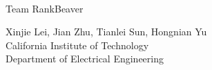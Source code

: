 \newif\ifshowsolutions
\showsolutionstrue

\newcommand{\boldline}[1]{\underline{\textbf{#1}}}



\pagestyle{fancy}
\begin{titlepage}
\parbox[t]{1.0\linewidth}{
	\centering \fontsize{50pt}{80pt}\selectfont %
	\vspace*{0.7cm} %
		
	\hfill {}\\
	\vspace*{0.7cm} %
}

{\centering \large 
\hfill Team RankBeaver
} \\

\vfill %


{\centering \large 
\hfill Xinjie Lei, Jian Zhu, Tianlei Sun, Hongnian Yu \\
\hfill California Institute of Technology \\
\hfill Department of Electrical Engineering \\

\HRule{1pt}} %


\clearpage %
\end{titlepage}

